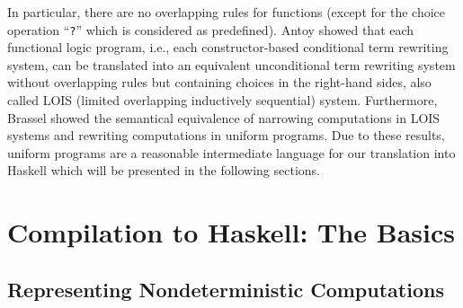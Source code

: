 \documentclass{llncs}
\newcommand{\code}[1]{\mbox{\small\texttt{#1}}}
\newcommand{\ccode}[1]{``\code{#1}''}
\begin{document}
%
In particular, there are no overlapping rules for functions
(except for the choice operation \ccode{?} which is considered as predefined).
Antoy \cite{Antoy01PPDP} showed that each functional logic program,
i.e., each constructor-based conditional term rewriting system,
can be translated into an equivalent unconditional term rewriting system
without overlapping rules but containing choices in the right-hand sides,
also called LOIS (limited overlapping inductively sequential) system.
Furthermore, Brassel \cite{Brassel11Thesis} showed the semantical
equivalence of narrowing computations in LOIS systems
and rewriting computations in uniform programs.
Due to these results, uniform programs are a reasonable intermediate
language for our translation into Haskell which will be presented
in the following sections.


\section{Compilation to Haskell: The Basics}
\label{sec:Compilation}

\subsection{Representing Nondeterministic Computations}
\end{document}
